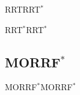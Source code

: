 \begin{frame}{RRT}{RRT$^{*}$}

\end{frame}


\begin{frame}{RRT$^{*}$}{RRT$^{*}$}
	
\end{frame}

\subsection{MORRF$^{*}$}

\begin{frame}{MORRF$^{*}$}{MORRF$^{*}$}
	
\end{frame}